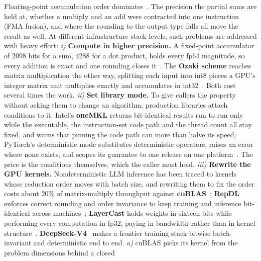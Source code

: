 \documentclass[sigplan,nonacm]{acmart}
\begin{document}
Floating-point accumulation order dominates~\cite{shanmugavelu2024fpna}. The precision the partial sums are held at, whether a multiply and an add were contracted into one
instruction (FMA fusion), and where the rounding to the output type falls all move the result
as well. At different infrastructure stack levels, such problems are addressed with heavy effort:
\emph{i)} \textbf{Compute in higher precision.} A fixed-point accumulator of
2098 bits for a sum, 4288 for a dot product, holds every fp64 magnitude, so
every addition is exact and one rounding closes
it~\cite{demmel2013reproducible,collange2015reduction,ahrens2020reproblas}. The
\textbf{Ozaki scheme} reaches matrix multiplication the other way, splitting
each input into int8 pieces a GPU's integer matrix unit multiplies exactly and
accumulates in int32~\cite{ozaki2025}. Both cost several times the work.
\emph{ii)} \textbf{Set library mode.} To give callers the property without
asking them to change an algorithm, production libraries attach conditions to
it. Intel's \textbf{oneMKL} returns bit-identical results run to run only while the
executable, the instruction-set code path and the thread count all stay fixed,
and warns that pinning the code path can more than halve its speed; PyTorch's
deterministic mode substitutes deterministic operators, raises an error where
none exists, and scopes its guarantee to one release on one
platform~\cite{mkl_cnr,pytorch_determinism}. The price is the conditions
themselves, which the caller must hold.
\emph{iii)} \textbf{Rewrite the GPU kernels.} Nondeterministic LLM inference has been
traced to kernels whose
reduction order moves with batch size, and rewriting them to fix the order costs
about 20\% of matrix-multiply throughput against
\textbf{cuBLAS}~\cite{he2025defeating}; \textbf{RepDL} enforces correct rounding and order
invariance to keep training and inference bit-identical across
machines~\cite{repdl2025}; \textbf{LayerCast} holds weights in sixteen bits while
performing every computation in fp32, paying in bandwidth rather than in kernel
structure~\cite{llmnondeterminism2025}. \textbf{DeepSeek-V4}~\cite{deepseekv4} makes a frontier training stack bitwise
batch-invariant and deterministic end to end.
\emph{a)} cuBLAS picks its kernel from the problem dimensions behind a closed
\end{document}
